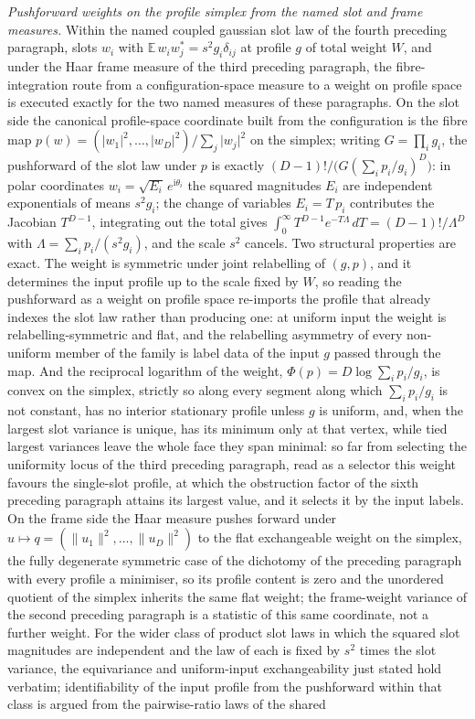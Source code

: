 \emph{Pushforward weights on the profile simplex from the named slot and frame measures.} Within the named coupled gaussian slot law of the fourth preceding paragraph, slots \(w_{i}\) with \(\mathbb{E}\,w_{i}w_{j}^{*}=s^{2}g_{i}\delta_{ij}\) at profile \(g\) of total weight \(W\), and under the Haar frame measure of the third preceding paragraph, the fibre-integration route from a configuration-space measure to a weight on profile space is executed exactly for the two named measures of these paragraphs. On the slot side the canonical profile-space coordinate built from the configuration is the fibre map \(p(w)=(\lvert w_{1}\rvert^{2},\dots,\lvert w_{D}\rvert^{2})/\sum_{j}\lvert w_{j}\rvert^{2}\) on the simplex; writing \(G=\prod_{i}g_{i}\), the pushforward of the slot law under \(p\) is exactly \((D-1)!\big/\bigl(G(\sum_{i}p_{i}/g_{i})^{D}\bigr)\): in polar coordinates \(w_{i}=\sqrt{E_{i}}\,e^{\mathrm{i}\theta_{i}}\) the squared magnitudes \(E_{i}\) are independent exponentials of means \(s^{2}g_{i}\); the change of variables \(E_{i}=T\,p_{i}\) contributes the Jacobian \(T^{D-1}\), integrating out the total gives \(\int_{0}^{\infty}T^{D-1}e^{-T\Lambda}\,dT=(D-1)!/\Lambda^{D}\) with \(\Lambda=\sum_{i}p_{i}/(s^{2}g_{i})\), and the scale \(s^{2}\) cancels. Two structural properties are exact. The weight is symmetric under joint relabelling of \((g,p)\), and it determines the input profile up to the scale fixed by \(W\), so reading the pushforward as a weight on profile space re-imports the profile that already indexes the slot law rather than producing one: at uniform input the weight is relabelling-symmetric and flat, and the relabelling asymmetry of every non-uniform member of the family is label data of the input \(g\) passed through the map. And the reciprocal logarithm of the weight, \(\Phi(p)=D\log\sum_{i}p_{i}/g_{i}\), is convex on the simplex, strictly so along every segment along which \(\sum_{i}p_{i}/g_{i}\) is not constant, has no interior stationary profile unless \(g\) is uniform, and, when the largest slot variance is unique, has its minimum only at that vertex, while tied largest variances leave the whole face they span minimal: so far from selecting the uniformity locus of the third preceding paragraph, read as a selector this weight favours the single-slot profile, at which the obstruction factor of the sixth preceding paragraph attains its largest value, and it selects it by the input labels. On the frame side the Haar measure pushes forward under \(u\mapsto q=(\lVert u_{1}\rVert^{2},\dots,\lVert u_{D}\rVert^{2})\) to the flat exchangeable weight on the simplex, the fully degenerate symmetric case of the dichotomy of the preceding paragraph with every profile a minimiser, so its profile content is zero and the unordered quotient of the simplex inherits the same flat weight; the frame-weight variance of the second preceding paragraph is a statistic of this same coordinate, not a further weight. For the wider class of product slot laws in which the squared slot magnitudes are independent and the law of each is fixed by \(s^{2}\) times the slot variance, the equivariance and uniform-input exchangeability just stated hold verbatim; identifiability of the input profile from the pushforward within that class is argued from the pairwise-ratio laws of the shared 